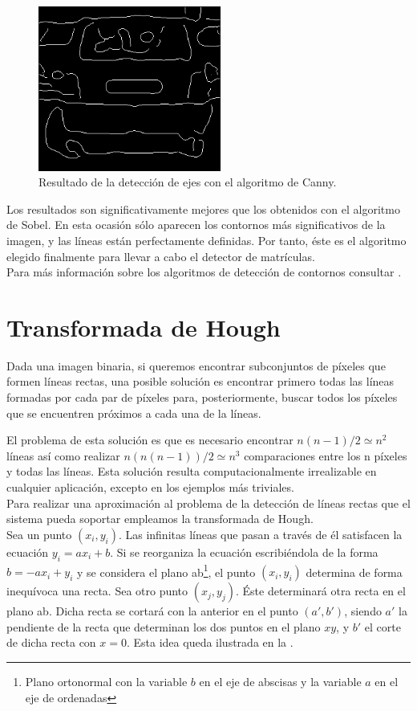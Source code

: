 \begin{figure}[!h]
\centering
\includegraphics[width=6cm]{EjemploCanny.png}
\caption{\small{Resultado de la detección de ejes con el algoritmo de Canny.}}
\label{EjemploCanny}
\end{figure}

Los resultados son significativamente mejores que los obtenidos con el algoritmo de Sobel. En esta ocasión sólo aparecen los contornos más significativos de la imagen, y las líneas están perfectamente definidas. Por tanto, éste es el algoritmo elegido finalmente para llevar a cabo el detector de matrículas.\\

Para más información sobre los algoritmos de detección de contornos consultar \cite{ImgProcess}.

\section{Transformada de Hough}\label{hough}
Dada una imagen binaria, si queremos encontrar subconjuntos de píxeles que formen líneas rectas, una posible solución es encontrar primero todas las líneas formadas por cada par de píxeles para, posteriormente, buscar todos los píxeles que se encuentren próximos a cada una de la líneas.

El problema de esta solución es que es necesario encontrar $n(n-1)/2 \simeq n^{2}$ líneas así como realizar $n(n(n-1))/2 \simeq n^{3}$ comparaciones entre los n píxeles y todas las líneas. Esta solución resulta computacionalmente irrealizable en cualquier aplicación, excepto en los ejemplos más triviales.\\

Para realizar una aproximación al problema de la detección de líneas rectas que el sistema pueda soportar empleamos la transformada de Hough.\\

Sea un punto $(x_{i},y_{i})$. Las infinitas líneas que pasan a través de él satisfacen la ecuación $y_{i}=ax_{i}+b$. Si se reorganiza la ecuación escribiéndola de la forma $b=-ax_{i}+y_{i}$ y se considera el plano ab\footnote{Plano ortonormal con la variable $b$ en el eje de abscisas y la variable $a$ en el eje de ordenadas}, el punto $(x_{i},y_{i})$ determina de forma inequívoca una recta. Sea otro punto $(x_{j},y_{j})$. Éste determinará otra recta en el plano ab. Dicha recta se cortará con la anterior en el punto $(a' , b')$, siendo $a'$ la pendiente de la recta que determinan los dos puntos en el plano $xy$, y $b'$ el corte de dicha recta con $x=0$. Esta idea queda ilustrada en la  . \\


